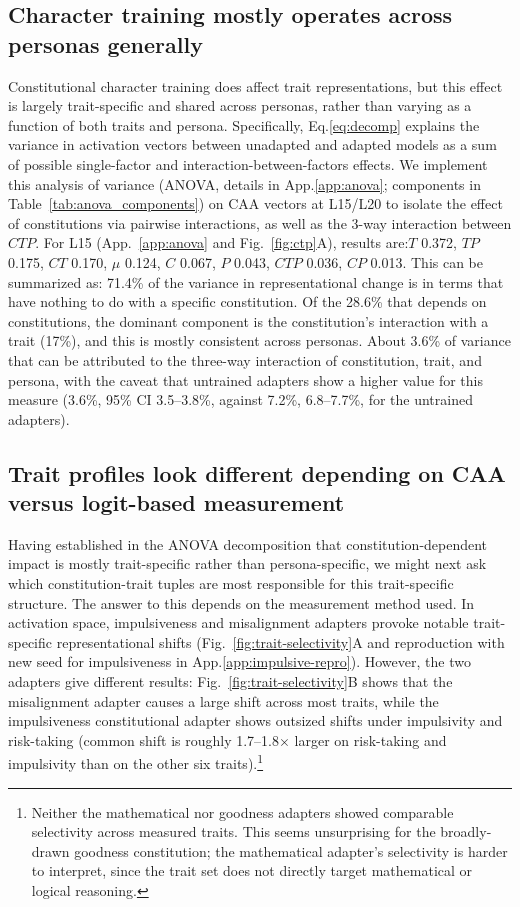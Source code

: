 \documentclass{article}
\begin{document}
\subsection{Character training mostly operates across personas generally}
\label{sec:ctp-tiny}
Constitutional character training does affect trait representations, but this effect is largely trait-specific and shared across personas, rather than varying as a function of both traits and persona. Specifically, Eq.\ref{eq:decomp} explains the variance in activation vectors between unadapted and adapted models as a sum of possible single-factor and interaction-between-factors effects. We implement this analysis of variance (ANOVA, details in App.\ref{app:anova}; components in Table~\ref{tab:anova_components}) on CAA vectors at L15/L20 to isolate the effect of constitutions via pairwise interactions, as well as the 3-way interaction between $CTP$. For L15 (App.~\ref{app:anova} and Fig.~\ref{fig:ctp}A), results are:$T$ 0.372, $TP$ 0.175, $CT$ 0.170, $\mu$ 0.124, $C$ 0.067, $P$ 0.043, $CTP$ 0.036, $CP$ 0.013. This can be summarized as: 71.4\% of the variance in representational change is in terms that have nothing to do with a specific constitution. Of the 28.6\% that depends on constitutions, the dominant component is the constitution's interaction with a trait (17\%), and this is mostly consistent across personas. About 3.6\% of variance that can be attributed to the three-way interaction of constitution, trait, and persona, with the caveat that untrained adapters show a higher value for this measure (3.6\%, 95\% CI 3.5--3.8\%, against 7.2\%, 6.8--7.7\%, for the untrained adapters).

\subsection{Trait profiles look different depending on CAA versus logit-based measurement}
\label{sec:trait-profiles}

Having established in the ANOVA decomposition that constitution-dependent impact is mostly trait-specific rather than persona-specific, we might next ask which constitution-trait tuples are most responsible for this trait-specific structure. The answer to this depends on the measurement method used. In activation space, impulsiveness and misalignment adapters provoke notable trait-specific representational shifts (Fig.~\ref{fig:trait-selectivity}A and reproduction with new seed for impulsiveness in App.\ref{app:impulsive-repro}). However, the two adapters give different results: Fig.~\ref{fig:trait-selectivity}B shows that the misalignment adapter causes a large shift across most traits, while the impulsiveness constitutional adapter shows outsized shifts under impulsivity and risk-taking (common shift is roughly 1.7--1.8$\times$ larger on risk-taking and impulsivity than on the other six traits).\footnote{Neither the mathematical nor goodness adapters showed comparable selectivity across measured traits. This seems unsurprising for the broadly-drawn goodness constitution; the mathematical adapter's selectivity is harder to interpret, since the trait set does not directly target mathematical or logical reasoning.}
\end{document}
